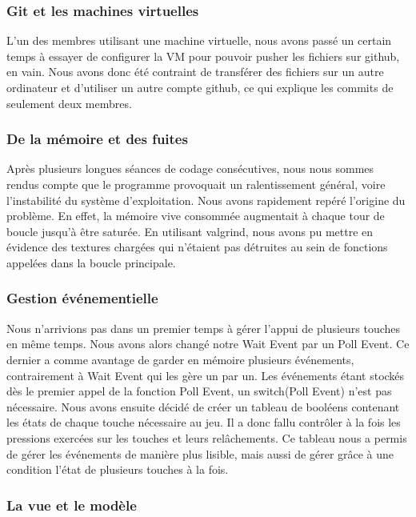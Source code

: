 	\subsubsection{Git et les machines virtuelles}
	L'un des membres utilisant une machine virtuelle, nous avons passé un certain temps à essayer de configurer la VM pour pouvoir pusher les fichiers sur github, en vain. Nous avons donc été contraint de transférer des fichiers sur un autre ordinateur et d'utiliser un autre compte github, ce qui explique les commits de seulement deux membres.

	\subsubsection{De la mémoire et des fuites}

Après plusieurs longues séances de codage consécutives, nous nous sommes rendus compte que le programme provoquait un ralentissement général, voire l'instabilité du système d'exploitation. Nous avons rapidement repéré l'origine du problème. En effet, la mémoire vive consommée augmentait à chaque tour de boucle jusqu'à être saturée. En utilisant valgrind, nous avons pu mettre en évidence des textures chargées qui n'étaient pas détruites au sein de fonctions appelées dans la boucle principale.

	\subsubsection{Gestion événementielle}
	
	Nous n'arrivions pas dans un premier temps à gérer l'appui de plusieurs touches en même temps. Nous avons alors changé notre Wait Event par un Poll Event. Ce dernier a comme avantage de garder en mémoire plusieurs événements, contrairement à Wait Event qui les gère un par un. Les événements étant stockés dès le premier appel de la fonction Poll Event, un switch(Poll Event) n'est pas nécessaire. Nous avons ensuite décidé de créer un tableau de booléens contenant les états de chaque touche nécessaire au jeu. Il a donc fallu contrôler à la fois les pressions exercées sur les touches et leurs relâchements. Ce tableau nous a permis de gérer les événements de manière plus lisible, mais aussi de gérer grâce à une condition l'état de plusieurs touches à la fois. 

	\subsubsection{La vue et le modèle}

